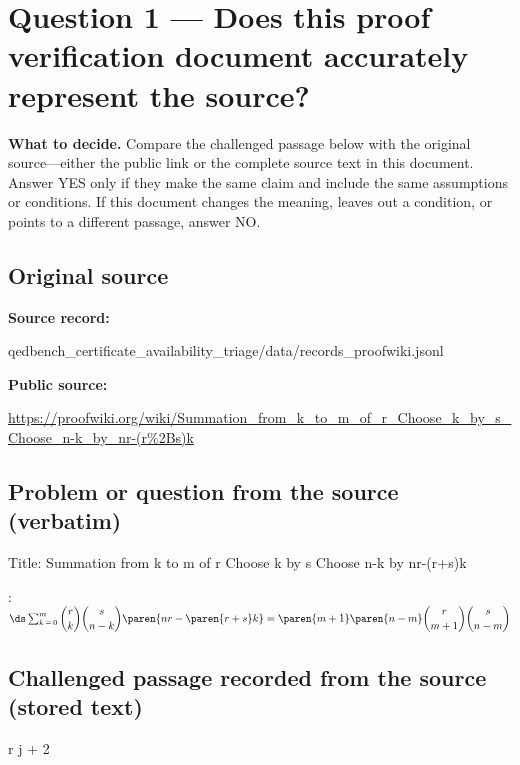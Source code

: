 \documentclass[11pt]{article}
\begin{document}
\section*{Question 1 --- Does this proof verification document accurately represent the source?}
\textbf{What to decide.} Compare the challenged passage below with the original source---either the public link or the complete source text in this document. Answer YES only if they make the same claim and include the same assumptions or conditions. If this document changes the meaning, leaves out a condition, or points to a different passage, answer NO.
\subsection*{Original source}
\textbf{Source record:}
\begin{Vsrc}
qedbench_certificate_availability_triage/data/records_proofwiki.jsonl
\end{Vsrc}
\textbf{Public source:}\par
\url{https://proofwiki.org/wiki/Summation_from_k_to_m_of_r_Choose_k_by_s_Choose_n-k_by_nr-(r\%2Bs)k}\par
\subsection*{Problem or question from the source (verbatim)}
\begin{Vsrc}
Title: Summation from k to m of r Choose k by s Choose n-k by nr-(r+s)k

:$\ds \sum_{k \mathop = 0}^m \dbinom r k \dbinom s {n - k} \paren {n r - \paren {r + s} k} = \paren {m + 1} \paren {n - m} \dbinom r {m + 1} \dbinom s {n - m}$
\end{Vsrc}
\subsection*{Challenged passage recorded from the source (stored text)}
\begin{Vsrc}
  \dbinom r {j + 2} 
\end{Vsrc}
\end{document}
